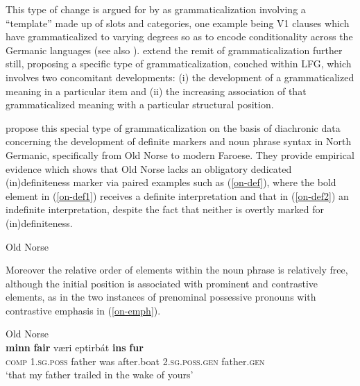 \documentclass[output=paper,hidelinks]{langscibook}
\begin{document}
This type of change is argued for by \citet{Borjarsetal16} as grammaticalization involving a ``template'' made up of slots and categories, one example being V1 clauses which have grammaticalized to varying degrees so as to encode conditionality across the Germanic languages (see also \citealp{hilpert2010-v1}).  \citet{Borjarsetal16}  extend the remit of grammaticalization further still, proposing a specific type of grammaticalization, couched within LFG,  which involves two concomitant developments: (i) the development of a grammaticalized meaning in a particular item and (ii) the increasing association  of that grammaticalized meaning with a particular structural position.


\citet{Borjarsetal16} propose this special type of grammaticalization on the basis of diachronic data concerning the development of definite markers and noun phrase syntax in North Germanic, specifically from Old Norse to modern Faroese. They provide empirical evidence which shows that Old Norse lacks an obligatory dedicated (in)definiteness marker via paired examples such as (\ref{on-def}), where the bold element in (\ref{on-def1}) receives a definite interpretation and that in (\ref{on-def2}) an indefinite interpretation, despite the fact that neither is overtly marked for (in)definiteness. %

\begin{exe}
\ex \label{on-def} Old Norse \citep[e10]{Borjarsetal16}
\begin{xlist}
\end{xlist}
\end{exe}

\noindent Moreover the relative order of elements within the noun phrase is relatively free, although the initial position is associated with prominent and contrastive elements, as in the two instances of prenominal possessive pronouns with contrastive emphasis in (\ref{on-emph}). %


\ea \label{on-emph} Old Norse \citep[e14]{Borjarsetal16}\\
 {\textbf{minn}} {\textbf{fa{\dh}ir}} {v{\ae}ri} {eptirb{\'a}t} {\textbf{{\th}ins}} {\textbf{f{}{\dh}ur}}   \\
{\textsc{comp}} {1.\textsc{sg.poss}} {father} {was} {after.boat} {2.\textsc{sg.poss.gen}} {father.\textsc{gen}} \\
\glt `that my father trailed in the wake of yours' \\
\z
\end{document}
